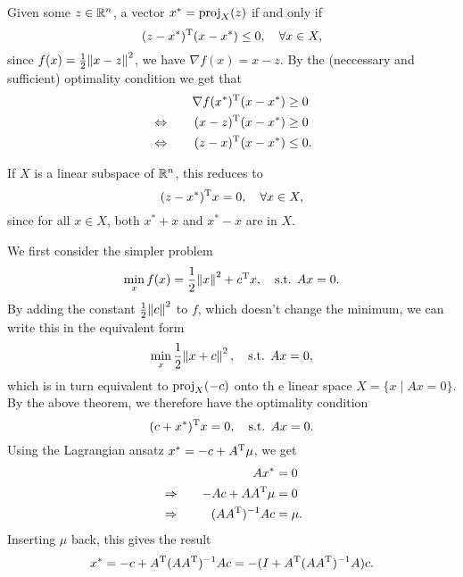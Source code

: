 \documentclass{article}
\begin{document}
\label{s:projection-theorem}

Given some \(z \in \mathbb{R}^n\), a vector \(x^* = \operatorname{proj}_X(z)\) if and only if
\begin{equation*}
  (z - x^*)^{\mathrm{T}}(x - x^*) \leq 0, \quad\forall x \in X,
\end{equation*}
since \(f(x) = \frac{1}{2} \enVert{x - z}^2\), we have \(\nabla f(x) = x - z\).  By the (neccessary
and sufficient) optimality condition we get that
\begin{alignat*}{2}
  &\quad & \nabla f(x^*)^{\mathrm{T}}(x - x^*) &\geq 0 \\
  &\Leftrightarrow\quad & (x - z)^{\mathrm{T}}(x - x^*) &\geq 0 \\
  &\Leftrightarrow\quad & (z - x)^{\mathrm{T}}(x - x^*) &\leq 0.
\end{alignat*}

If \(X\) is a linear subspace of \(\mathbb{R}^n\), this reduces to 
\begin{equation*}
  (z - x^*)^{\mathrm{T}}x = 0, \quad\forall x \in X,
\end{equation*}
since for all \(x \in X\), both \(x^* + x\) and \(x^* - x\)
are in \(X\).


\label{s:equality-constrained-quadratic-problems}

We first consider the simpler problem
\begin{equation*}
  \min_x f(x) = \frac{1}{2} \enVert{x}^2 + \T{c}x, \quad\text{s.t. } Ax = 0.
\end{equation*}
By adding the constant \(\frac{1}{2} \enVert{c}^2\) to \(f\), which doesn't change the minimum, we
can write this in the equivalent form
\begin{equation*}
  \min_x \frac{1}{2} \enVert{x + c}^2, \quad\text{s.t. } Ax = 0,
\end{equation*}
which is in turn equivalent to \(\operatorname{proj}_X (-c)\) onto th e linear space \(X = \{x \mid Ax = 0\}\).  By
the above theorem, we therefore have the optimality condition
\begin{equation*}
  (c + x^*)^{\mathrm{T}}x = 0, \quad\text{s.t. } Ax = 0.
\end{equation*}
Using the Lagrangian ansatz \(x^* = -c + A^{\mathrm{T}}\mu\), we get
\begin{alignat*}{2}
  &\quad & Ax^* &= 0 \\
  &\Rightarrow\quad & - Ac + AA^{\mathrm{T}}\mu &= 0 \\
  &\Rightarrow\quad & (AA^{\mathrm{T}})^{-1}Ac &= \mu.
\end{alignat*}
Inserting \(\mu\) back, this gives the result
\begin{equation*}
  x^* = -c + A^{\mathrm{T}}(AA^{\mathrm{T}})^{-1}Ac = -(I + A^{\mathrm{T}}(AA^{\mathrm{T}})^{-1}A)c.
\end{equation*}
\end{document}
